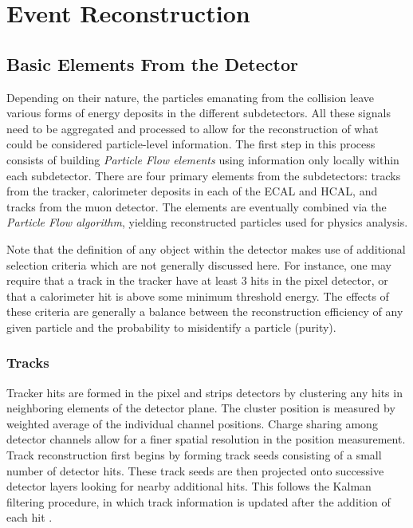 \chapter{Event Reconstruction}
\label{chap:eventreco}

\section{Basic Elements From the Detector} 

Depending on their nature, the particles emanating from the collision leave various forms of energy deposits in the different subdetectors. All these signals need to be aggregated and processed to allow for the reconstruction of what could be considered particle-level information. The first step in this process consists of building \textit{Particle Flow elements} using information only locally within each subdetector. There are four primary elements from the subdetectors: tracks from the tracker, calorimeter deposits in each of the ECAL and HCAL, and tracks from the muon detector. The elements are eventually combined via the \textit{Particle Flow algorithm}, yielding reconstructed particles used for physics analysis.

Note that the definition of any object within the detector makes use of additional selection criteria which are not generally discussed here. For instance, one may require that a track in the tracker have at least 3 hits in the pixel detector, or that a calorimeter hit is above some minimum threshold energy. The effects of these criteria are generally a balance between the reconstruction efficiency of any given particle and the probability to misidentify a particle (purity).

\subsection{Tracks}%

Tracker hits are formed in the pixel and strips detectors by clustering any hits in neighboring elements of the detector plane. The cluster position is measured by weighted average of the individual channel positions. Charge sharing among detector channels allow for a finer spatial resolution in the position measurement. Track reconstruction first begins by forming track seeds consisting of a small number of detector hits. These track seeds are then projected onto successive detector layers looking for nearby additional hits. This follows the Kalman filtering procedure, in which track information is updated after the addition of each hit \cite{trackerreco}.
 
